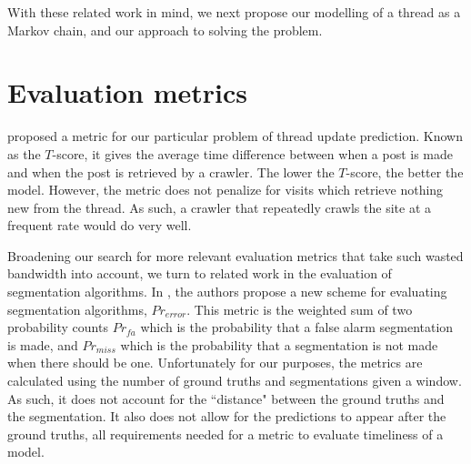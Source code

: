 


With these related work in mind, we next propose our modelling of a thread as a 
Markov chain, and our approach to solving the problem.

\section{Evaluation metrics}
 
 proposed a metric for our particular problem of thread update prediction. Known as the $T$-score, it gives the average 
time difference between when a post is made and when the post is retrieved by a crawler. The lower the $T$-score, the 
better the model. However, the metric does not penalize for visits which retrieve 
nothing new from the thread.  As such, a crawler that repeatedly crawls the site 
at a frequent rate would do very well.

Broadening our search for more relevant evaluation metrics that take such
wasted bandwidth into account, we turn to related work in the evaluation of
segmentation algorithms.  In , the authors propose a
new scheme for evaluating segmentation algorithms, $Pr_{error}$. 
This metric is the weighted sum of two 
probability counts $Pr_{fa}$ which is the probability that a false alarm 
segmentation is made, and $Pr_{miss}$ which is the probability that a 
segmentation is not made when there should be one. Unfortunately for our 
purposes, the metrics are calculated using the number of ground truths and 
segmentations given a window. As such, it does not account for the ``distance" 
between the ground truths and the segmentation. It also does not allow for the 
predictions to appear after the ground truths, all requirements needed for a 
metric to evaluate timeliness of a model.

